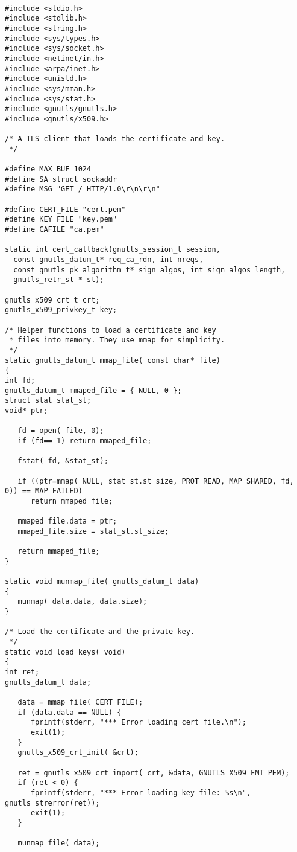 \begin{verbatim}

#include <stdio.h>
#include <stdlib.h>
#include <string.h>
#include <sys/types.h>
#include <sys/socket.h>
#include <netinet/in.h>
#include <arpa/inet.h>
#include <unistd.h>
#include <sys/mman.h>
#include <sys/stat.h>
#include <gnutls/gnutls.h>
#include <gnutls/x509.h>

/* A TLS client that loads the certificate and key.
 */

#define MAX_BUF 1024
#define SA struct sockaddr
#define MSG "GET / HTTP/1.0\r\n\r\n"

#define CERT_FILE "cert.pem"
#define KEY_FILE "key.pem"
#define CAFILE "ca.pem"

static int cert_callback(gnutls_session_t session,
  const gnutls_datum_t* req_ca_rdn, int nreqs,
  const gnutls_pk_algorithm_t* sign_algos, int sign_algos_length,
  gnutls_retr_st * st);

gnutls_x509_crt_t crt;
gnutls_x509_privkey_t key;

/* Helper functions to load a certificate and key
 * files into memory. They use mmap for simplicity.
 */
static gnutls_datum_t mmap_file( const char* file)
{
int fd;
gnutls_datum_t mmaped_file = { NULL, 0 };
struct stat stat_st;
void* ptr;

   fd = open( file, 0);
   if (fd==-1) return mmaped_file;
   
   fstat( fd, &stat_st);
   
   if ((ptr=mmap( NULL, stat_st.st_size, PROT_READ, MAP_SHARED, fd, 0)) == MAP_FAILED)
      return mmaped_file;
   
   mmaped_file.data = ptr;
   mmaped_file.size = stat_st.st_size;
   
   return mmaped_file;
}

static void munmap_file( gnutls_datum_t data)
{
   munmap( data.data, data.size);
}

/* Load the certificate and the private key.
 */
static void load_keys( void)
{
int ret;
gnutls_datum_t data;

   data = mmap_file( CERT_FILE);
   if (data.data == NULL) {
      fprintf(stderr, "*** Error loading cert file.\n");
      exit(1);
   }
   gnutls_x509_crt_init( &crt);
   
   ret = gnutls_x509_crt_import( crt, &data, GNUTLS_X509_FMT_PEM);
   if (ret < 0) {
      fprintf(stderr, "*** Error loading key file: %s\n", gnutls_strerror(ret));
      exit(1);
   }

   munmap_file( data);


\end{verbatim}
